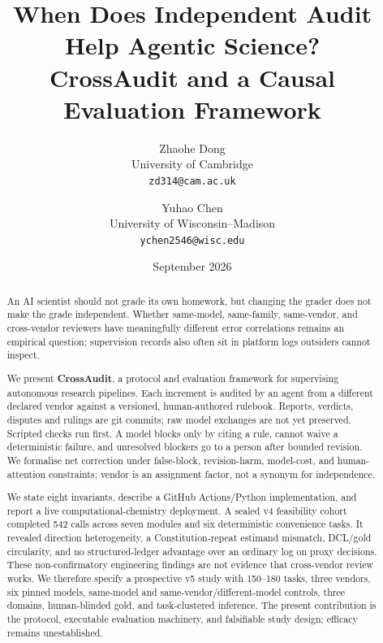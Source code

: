 \documentclass[11pt,letterpaper]{article}
\title{\textbf{When Does Independent Audit Help Agentic Science?\\CrossAudit and a Causal Evaluation Framework}}
\author{Zhaohe Dong\\
\normalsize University of Cambridge\\
\normalsize \texttt{zd314@cam.ac.uk}
\and Yuhao Chen\\
\normalsize University of Wisconsin--Madison\\
\normalsize \texttt{ychen2546@wisc.edu}}
\date{September 2026}
\begin{document}
\maketitle

\begin{abstract}
\noindent An AI scientist should not grade its own homework, but changing the grader does not make the grade independent. Whether same-model, same-family, same-vendor, and cross-vendor reviewers have meaningfully different error correlations remains an empirical question; supervision records also often sit in platform logs outsiders cannot inspect.

We present \textbf{CrossAudit}, a protocol and evaluation framework for supervising autonomous research pipelines. Each increment is audited by an agent from a different declared vendor against a versioned, human-authored rulebook. Reports, verdicts, disputes and rulings are git commits; raw model exchanges are not yet preserved. Scripted checks run first. A model blocks only by citing a rule, cannot waive a deterministic failure, and unresolved blockers go to a person after bounded revision. We formalise net correction under false-block, revision-harm, model-cost, and human-attention constraints; vendor is an assignment factor, not a synonym for independence.

We state eight invariants, describe a GitHub Actions/Python implementation, and report a live computational-chemistry deployment. A sealed v4 feasibility cohort completed 542 calls across seven modules and six deterministic convenience tasks. It revealed direction heterogeneity, a Constitution-repeat estimand mismatch, DCL/gold circularity, and no structured-ledger advantage over an ordinary log on proxy decisions. These non-confirmatory engineering findings are not evidence that cross-vendor review works. We therefore specify a prospective v5 study with 150--180 tasks, three vendors, six pinned models, same-model and same-vendor/different-model controls, three domains, human-blinded gold, and task-clustered inference. The present contribution is the protocol, executable evaluation machinery, and falsifiable study design; efficacy remains unestablished.
\end{abstract}

\vspace{5pt}
\end{document}
